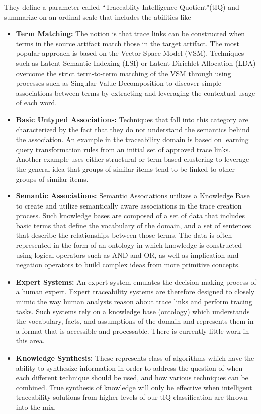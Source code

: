 \documentclass{report}
\begin{document}
They define a parameter called ``Traceablity Intelligence Quotient"(tIQ) and summarize on an ordinal
scale that includes the abilities like
\begin{itemize}
\item \textbf{Term Matching:} The notion is that trace links can be constructed when terms in the 
source artifact match those in the target artifact. The most popular approach is based on the Vector
Space Model (VSM). Techniques such as Latent Semantic Indexing (LSI) or Latent Dirichlet Allocation
(LDA) overcome the strict term-to-term matching of the VSM through using processes such as Singular
Value Decomposition to discover simple associations between terms by extracting and leveraging the
contextual usage of each word.
\item \textbf{Basic Untyped Associations:} Techniques that fall into this category are characterized
by the fact that they do not understand the semantics behind the association. An example in the 
traceability domain is based on learning query transformation rules from an initial set of approved 
trace links. Another example uses either structural or term-based clustering to leverage the general
idea that groups of similar items tend to be linked to other groups of similar items.
\item \textbf{Semantic Associations:} Semantic Associations utilizes a Knowledge Base to create and
utilize semantically aware associations in the trace creation process. Such knowledge bases are composed
of a set of data that includes basic terms that define the vocabulary of the domain, and a set of 
sentences that describe the relationships between those terms. The data is often represented in the 
form of an ontology in which knowledge is constructed using logical operators such as AND and OR,
as well as implication and negation operators to build complex ideas from more primitive concepts.
\item \textbf{Expert Systems:} An expert system emulates the decision-making process of a human expert.
Expert traceability systems are therefore designed to closely mimic the way human analysts reason about
trace links and perform tracing tasks. Such systems rely on a knowledge base (ontology) which understands
the vocabulary, facts, and assumptions of the domain and represents them in a format that is accessible
and processable. There is currently little work in this area.
\item \textbf{Knowledge Synthesis:} These represents class of algorithms which have the ability to 
synthesize information in order to address the question of when each different technique should be used,
and how various techniques can be combined. True synthesis of knowledge will only be effective when
intelligent traceability solutions from higher levels of our tIQ classification are thrown into the mix.
\end{itemize}
\end{document}
